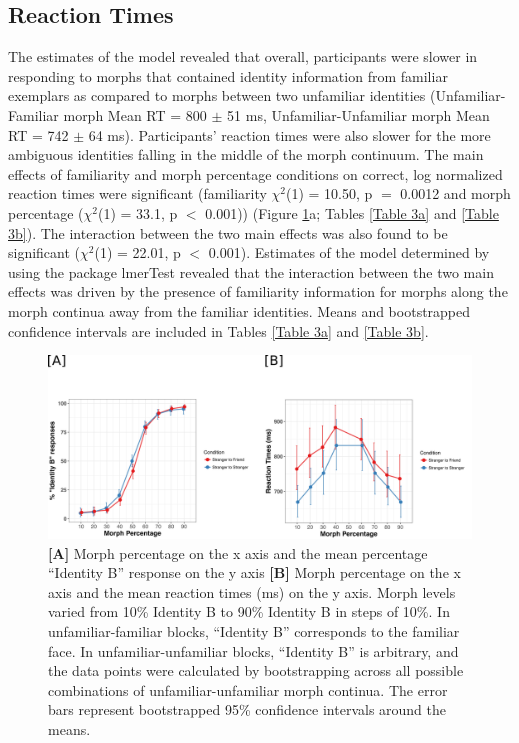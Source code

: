 \documentclass[10pt,letterpaper]{article}
\begin{document}
\subsection*{Reaction Times}
The estimates of the model revealed that overall, participants were slower in responding to morphs that contained identity information from familiar exemplars as compared to morphs between two unfamiliar identities (Unfamiliar-Familiar morph Mean RT = 800 $\pm$ 51 ms, Unfamiliar-Unfamiliar morph Mean RT = 742 $\pm$ 64 ms). Participants’ reaction times were also slower for the more ambiguous identities falling in the middle of the morph continuum. The main effects of familiarity and morph percentage conditions on correct, log normalized reaction times were significant (familiarity \( \chi^2 \)(1) = 10.50, p $=$ 0.0012 and morph percentage (\( \chi^2 \)(1) = 33.1, p $<$ 0.001)) (Figure \ref{Figure 2}a; Tables \ref{Table 3a} and \ref{Table 3b}). The interaction between the two main effects was also found to be significant (\( \chi^2 \)(1) = 22.01, p $<$ 0.001). Estimates of the model determined by using the package lmerTest \cite{kuznetsova2017lmertest} revealed that the interaction between the two main effects was driven by the presence of familiarity information for morphs along the morph continua away from the familiar identities. Means and bootstrapped confidence intervals are included in Tables \ref{Table 3a} and \ref{Table 3b}. 

\begin{figure}[ht] %

\includegraphics[width=\textwidth]{figure2.png}

\caption{\color{Gray} \textbf{[A]} Morph percentage on the x axis and the mean percentage “Identity B” response on the y axis \textbf{[B]} Morph percentage on the x axis and the mean reaction times (ms) on the y axis. Morph levels varied from 10\% Identity B to 90\% Identity B in steps of 10\%. In unfamiliar-familiar blocks, “Identity B” corresponds to the familiar face. In unfamiliar-unfamiliar blocks, “Identity B” is arbitrary, and the data points were calculated by bootstrapping across all possible combinations of unfamiliar-unfamiliar morph continua. The error bars represent bootstrapped 95\% confidence intervals around the means.}

\label{Figure 2} %

\end{figure}
\end{document}
